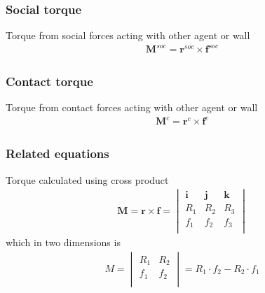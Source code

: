 \subsubsection{Social torque}
Torque from social forces acting with other agent or wall
\begin{align}
\mathbf{M}_{}^{soc} = \mathbf{r}_{}^{soc} \times \mathbf{f}_{}^{soc}
\end{align}

\subsubsection{Contact torque}
Torque from contact forces acting with other agent or wall
\begin{align}
\mathbf{M}_{}^{c} = \mathbf{r}_{}^{c} \times \mathbf{f}_{}^{c}
\end{align}

\subsubsection{Related equations}
Torque calculated using cross product
\begin{align}
\mathbf{M} = \mathbf{r} \times \mathbf{f} =  \begin{vmatrix} \mathbf{i} & \mathbf{j} & \mathbf{k} \\ R_{1} & R_{2} & R_{3} \\ f_{1} & f_{2} & f_{3} \\ \end{vmatrix} 
\end{align}
which in two dimensions is
\begin{align}
M = \begin{vmatrix} R_{1} & R_{2} \\ f_{1} & f_{2} \\ \end{vmatrix} = R_{1} \cdot f_{2} - R_{2} \cdot f_{1}
\end{align}